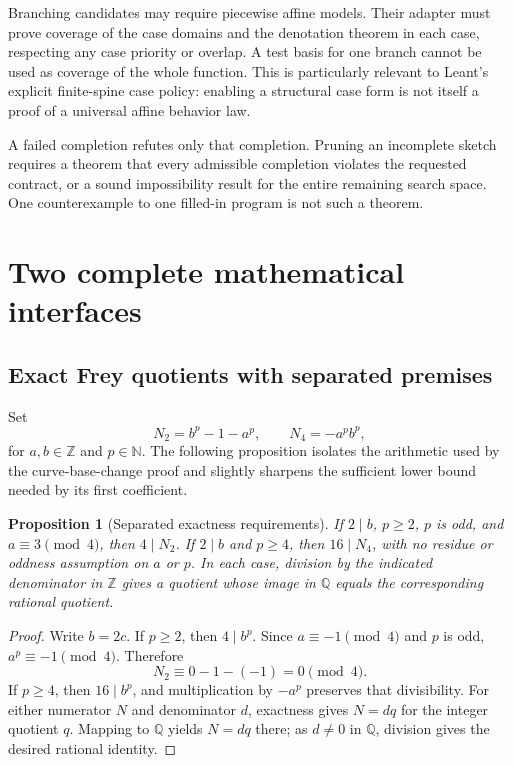 \documentclass[11pt,a4paper]{article}
\newcommand{\N}{\mathbb N}
\newcommand{\Z}{\mathbb Z}
\newcommand{\Q}{\mathbb Q}
\newtheorem{proposition}[theorem]{Proposition}
\theoremstyle{definition}
\theoremstyle{remark}
\begin{document}
Branching candidates may require piecewise affine models. Their adapter must
prove coverage of the case domains and the denotation theorem in each case,
respecting any case priority or overlap. A test basis for one branch cannot be
used as coverage of the whole function. This is particularly relevant to
Leant's explicit finite-spine case policy: enabling a structural case form is
not itself a proof of a universal affine behavior law.

A failed completion refutes only that completion. Pruning an incomplete sketch
requires a theorem that every admissible completion violates the requested
contract, or a sound impossibility result for the entire remaining search
space. One counterexample to one filled-in program is not such a theorem.

\section{Two complete mathematical interfaces}\label{sec:interfaces}

\subsection{Exact Frey quotients with separated premises}

Set
\[
 N_2=b^p-1-a^p,\qquad N_4=-a^pb^p,
\]
for $a,b\in\Z$ and $p\in\N$. The following proposition isolates the
arithmetic used by the curve-base-change proof and slightly sharpens the
sufficient lower bound needed by its first coefficient.

\begin{proposition}[Separated exactness requirements]\label{prop:frey}
If $2\mid b$, $p\ge2$, $p$ is odd, and $a\equiv3\pmod4$, then $4\mid N_2$.
If $2\mid b$ and $p\ge4$, then $16\mid N_4$, with no residue or oddness
assumption on $a$ or $p$. In each case, division by the indicated denominator
in $\Z$ gives a quotient whose image in $\Q$ equals the corresponding rational
quotient.
\end{proposition}

\begin{proof}
Write $b=2c$. If $p\ge2$, then $4\mid b^p$. Since $a\equiv-1\pmod4$ and
$p$ is odd, $a^p\equiv-1\pmod4$. Therefore
\[
 N_2\equiv0-1-(-1)=0\pmod4.
\]
If $p\ge4$, then $16\mid b^p$, and multiplication by $-a^p$ preserves that
divisibility. For either numerator $N$ and denominator $d$, exactness gives
$N=dq$ for the integer quotient $q$. Mapping to $\Q$ yields $N=dq$ there;
as $d\ne0$ in $\Q$, division gives the desired rational identity.
\end{proof}
\end{document}
